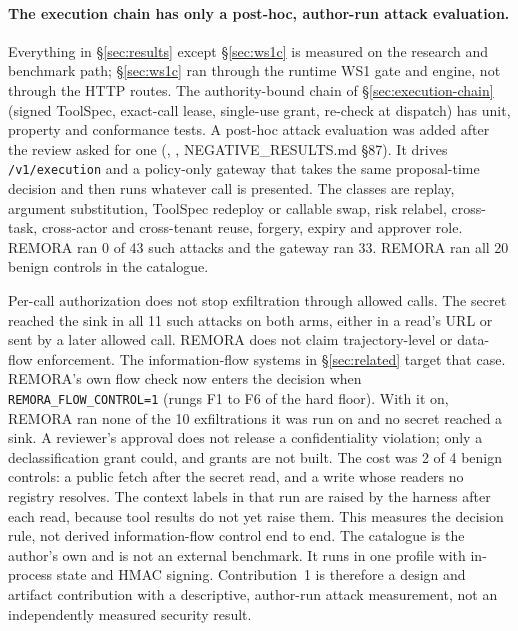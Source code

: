\documentclass[10pt,twocolumn]{article}
\begin{document}
\paragraph{The execution chain has only a post-hoc, author-run attack evaluation.}
Everything in \S\ref{sec:results} except \S\ref{sec:ws1c} is measured
on the research and benchmark path; \S\ref{sec:ws1c} ran through the
runtime WS1 gate and engine, not through the HTTP routes. The authority-bound chain of \S\ref{sec:execution-chain}
(signed ToolSpec, exact-call lease, single-use grant, re-check at dispatch)
has unit, property and conformance tests. A post-hoc attack evaluation was
added after the review asked for one
(,
,
NEGATIVE\_RESULTS.md \S87). It drives \texttt{/v1/execution} and a
policy-only gateway that takes the same proposal-time decision and then runs
whatever call is presented. The classes are replay, argument substitution,
ToolSpec redeploy or callable swap, risk relabel, cross-task, cross-actor
and cross-tenant reuse, forgery, expiry and approver role. REMORA ran 0 of
43 such attacks and the gateway ran 33. REMORA ran all 20 benign controls in
the catalogue.

Per-call authorization does not stop exfiltration through allowed calls.
The secret reached the sink in all 11 such attacks on both arms, either in a
read's URL or sent by a later allowed call. REMORA does not claim
trajectory-level or data-flow enforcement. The information-flow systems in
\S\ref{sec:related} \cite{wu2024fsecure,costa2025fides} target that case.
REMORA's own flow check now enters the decision when
\texttt{REMORA\_FLOW\_CONTROL=1} (rungs F1 to F6 of the hard floor). With
it on, REMORA ran none of the 10 exfiltrations it was run on and no secret
reached a sink. A reviewer's approval does not release a confidentiality
violation; only a declassification grant could, and grants are not built.
The cost was 2 of 4 benign controls: a public fetch after the secret read,
and a write whose readers no registry resolves. The context labels in that
run are raised by the harness after each read, because tool results do not
yet raise them. This measures the decision rule, not derived
information-flow control end to end. The
catalogue is the author's own and is not an external benchmark. It runs in
one profile with in-process state and HMAC signing. Contribution~1 is
therefore a design and artifact contribution with a descriptive, author-run
attack measurement, not an independently measured security result.
\end{document}
